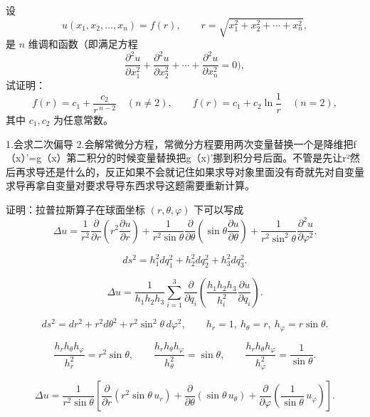 \begin{homework}[1]
设
\[
u(x_1,x_2,\dots,x_n)=f(r),\qquad
r=\sqrt{x_1^2+x_2^2+\cdots+x_n^2},
\]
是 $n$ 维调和函数（即满足方程
\[
\frac{\partial^2 u}{\partial x_1^2}
+\frac{\partial^2 u}{\partial x_2^2}
+\cdots
+\frac{\partial^2 u}{\partial x_n^2}=0),
\]
试证明：
\[
f(r)=c_1+\frac{c_2}{r^{\,n-2}}\quad (n\ne 2),\qquad
f(r)=c_1+c_2\ln\frac1r\quad (n=2),
\]
其中 $c_1,c_2$ 为任意常数。
\end{homework}

\begin{dxtips}
 1.会求二次偏导
 2.会解常微分方程，常微分方程要用两次变量替换一个是降维把f（x）’=g（x）第二积分的时候变量替换把g（x)'挪到积分号后面。不管是先让r²然后再求导还是什么的，反正如果不会就记住如果求导对象里面没有奇就先对自变量求导再拿自变量对要求导导东西求导这题需要重新计算。
\end{dxtips}
    





\begin{homework}[2]
证明：拉普拉斯算子在球面坐标 $(r,\theta,\varphi)$ 下可以写成
\[
\Delta u
=\frac1{r^2}\frac{\partial}{\partial r}\!\left(r^2\frac{\partial u}{\partial r}\right)
+\frac1{r^2\sin\theta}\frac{\partial}{\partial\theta}\!\left(\sin\theta\frac{\partial u}{\partial\theta}\right)
+\frac1{r^2\sin^2\theta}\frac{\partial^2 u}{\partial\varphi^2}.
\]
\end{homework}
\begin{dxtips}
    $$ds^{2}=h_{1}^{2}dq_{1}^{2}+h_{2}^{2}dq_{2}^{2}+h_{3}^{2}dq_{3}^{2}.$$

$$\Delta u=\frac{1}{h_{1}h_{2}h_{3}}\sum_{i=1}^{3}\frac{\partial}{\partial q_{i}}
\left(\frac{h_{1}h_{2}h_{3}}{h_{i}^{2}}\frac{\partial u}{\partial q_{i}}\right).$$

$$ds^{2}=dr^{2}+r^{2}d\theta^{2}+r^{2}\sin^{2}\theta\,d\varphi^{2},\qquad
h_{r}=1,\ h_{\theta}=r,\ h_{\varphi}=r\sin\theta.$$

$$\frac{h_{r}h_{\theta}h_{\varphi}}{h_{r}^{2}}=r^{2}\sin\theta,\qquad
\frac{h_{r}h_{\theta}h_{\varphi}}{h_{\theta}^{2}}=\sin\theta,\qquad
\frac{h_{r}h_{\theta}h_{\varphi}}{h_{\varphi}^{2}}=\frac{1}{\sin\theta}.$$

$$\Delta u=\frac{1}{r^{2}\sin\theta}\left[
\frac{\partial}{\partial r}\!\left(r^{2}\sin\theta\,u_{r}\right)
+\frac{\partial}{\partial\theta}\!\left(\sin\theta\,u_{\theta}\right)
+\frac{\partial}{\partial\varphi}\!\left(\frac{1}{\sin\theta}\,u_{\varphi}\right)
\right].$$
\end{dxtips}

